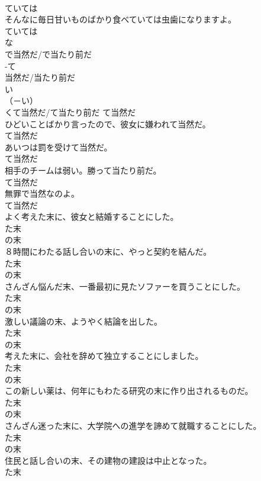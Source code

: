 \documentclass[8pt]{extreport}
\begin{document}
\begin{CJK}{UTF8}{min}
\\	ていては
\\	そんなに毎日甘いものばかり食べていては虫歯になりますよ。	
\\	ていては
\\	な
\\	で当然だ/で当たり前だ	
\\	-て
\\	当然だ/当たり前だ	
\\	い
\\	（－い） 
\\	くて当然だ/て当たり前だ	て当然だ
\\	ひどいことばかり言ったので、彼女に嫌われて当然だ。	
\\	て当然だ
\\	あいつは罰を受けて当然だ。	
\\	て当然だ
\\	相手のチームは弱い。勝って当たり前だ。	
\\	て当然だ
\\	無罪で当然なのよ。	
\\	て当然だ
\\	よく考えた末に、彼女と結婚することにした。	
\\	た末 
\\	の末
\\	８時間にわたる話し合いの末に、やっと契約を結んだ。	
\\	た末 
\\	の末
\\	さんざん悩んだ末、一番最初に見たソファーを買うことにした。	
\\	た末 
\\	の末
\\	激しい議論の末、ようやく結論を出した。	
\\	た末 
\\	の末
\\	考えた末に、会社を辞めて独立することにしました。	
\\	た末 
\\	の末
\\	この新しい薬は、何年にもわたる研究の末に作り出されるものだ。	
\\	た末 
\\	の末
\\	さんざん迷った末に、大学院への進学を諦めて就職することにした。	
\\	た末 
\\	の末
\\	住民と話し合いの末、その建物の建設は中止となった。	
\\	た末 

\end{CJK}
\end{document}

